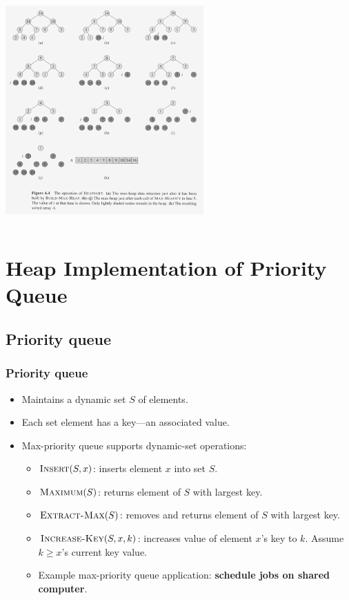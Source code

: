 \documentclass[notes,serif]{beamer}
\begin{document}
\begin{frame}
\begin{columns}
  \begin{block}{}
    \includegraphics[height=8cm]{06-fig-heapsort}
  \end{block}
\end{columns}
\end{frame}

\section{Heap Implementation of Priority Queue}
\subsection{Priority queue}
\begin{frame}
  \frametitle{Priority queue}
  \begin{itemize}
    \item Maintains a dynamic set $S$ of elements.
    \item Each set element has a key---an associated value.
    \item Max-priority queue supports dynamic-set operations:
    \begin{itemize}
      \item $\textsc{Insert}(S, x)$: inserts element $x$ into set $S$.
      \item $\textsc{Maximum}(S)$: returns element of $S$ with largest key.
      \item $\textsc{Extract-Max}(S)$: removes and returns element of $S$ with largest key.
      \item $\textsc{Increase-Key}(S, x, k)$: increases value of element $x$'s key to $k$.  Assume $k \ge x$'s current key value.
      \item Example max-priority queue application: {\bf schedule jobs on shared computer}.
    \end{itemize}
  \end{itemize}
\end{frame}
\end{document}
